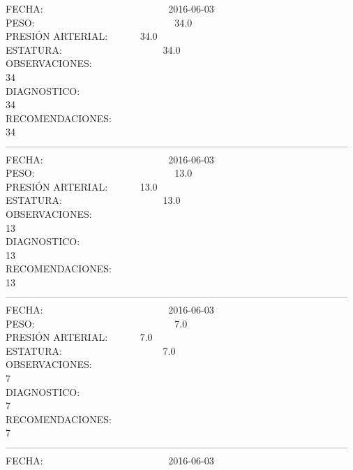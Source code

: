 \documentclass[10pt,a4paper]{letter}
\begin{document}
FECHA: \ \ \ \ \ \ \ \ \ \ \ \ \ \ \ \ \ \ \ \ \ \ \ \ \ 2016-06-03 \\
PESO: \ \ \ \ \ \ \ \ \ \ \ \ \ \ \ \ \ \ \ \ \ \ \ \ \ \ \ \ 34.0 \\
PRESIÓN ARTERIAL: \ \ \ \ \ \ 34.0 \\
ESTATURA: \ \ \ \ \ \ \ \ \ \ \ \ \ \ \ \ \ \ \ \ 34.0\\
OBSERVACIONES:\\
34\\
DIAGNOSTICO:\\
34\\
RECOMENDACIONES:\\
34\\
--------------------------------------------------------------------------------------------------------- \\
FECHA: \ \ \ \ \ \ \ \ \ \ \ \ \ \ \ \ \ \ \ \ \ \ \ \ \ 2016-06-03 \\
PESO: \ \ \ \ \ \ \ \ \ \ \ \ \ \ \ \ \ \ \ \ \ \ \ \ \ \ \ \ 13.0 \\
PRESIÓN ARTERIAL: \ \ \ \ \ \ 13.0 \\
ESTATURA: \ \ \ \ \ \ \ \ \ \ \ \ \ \ \ \ \ \ \ \ 13.0\\
OBSERVACIONES:\\
13\\
DIAGNOSTICO:\\
13\\
RECOMENDACIONES:\\
13\\
--------------------------------------------------------------------------------------------------------- \\
FECHA: \ \ \ \ \ \ \ \ \ \ \ \ \ \ \ \ \ \ \ \ \ \ \ \ \ 2016-06-03 \\
PESO: \ \ \ \ \ \ \ \ \ \ \ \ \ \ \ \ \ \ \ \ \ \ \ \ \ \ \ \ 7.0 \\
PRESIÓN ARTERIAL: \ \ \ \ \ \ 7.0 \\
ESTATURA: \ \ \ \ \ \ \ \ \ \ \ \ \ \ \ \ \ \ \ \ 7.0\\
OBSERVACIONES:\\
7\\
DIAGNOSTICO:\\
7\\
RECOMENDACIONES:\\
7\\
--------------------------------------------------------------------------------------------------------- \\
FECHA: \ \ \ \ \ \ \ \ \ \ \ \ \ \ \ \ \ \ \ \ \ \ \ \ \ 2016-06-03 \\
\end{document}
